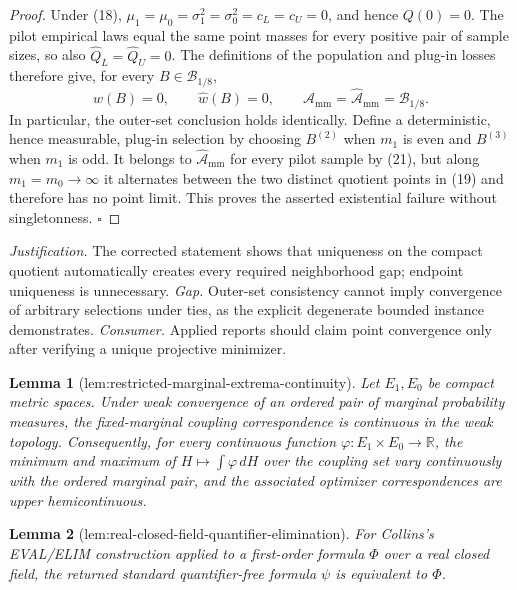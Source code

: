 \documentclass{article}
\newtheorem{lemma}{Lemma}
\begin{document}
\begin{proof}
Under (18), \(\mu_1=\mu_0=\sigma_1^2=\sigma_0^2=c_L=c_U=0\), and hence \(Q(0)=0\).  The pilot empirical laws equal the same point masses for every positive pair of sample sizes, so also \(\widehat Q_L=\widehat Q_U=0\).  The definitions of the population and plug-in losses therefore give, for every \(B\in\mathcal B_{1/8}\),
\[
w(B)=0,
\qquad
\widehat w(B)=0,
\qquad
\mathcal A_{\mathrm{mm}}
=\widehat{\mathcal A}_{\mathrm{mm}}
=\mathcal B_{1/8}.
\tag{21}
\]
In particular, the outer-set conclusion holds identically.  Define a deterministic, hence measurable, plug-in selection by choosing \(B^{(2)}\) when \(m_1\) is even and \(B^{(3)}\) when \(m_1\) is odd.  It belongs to \(\widehat{\mathcal A}_{\mathrm{mm}}\) for every pilot sample by (21), but along \(m_1=m_0\to\infty\) it alternates between the two distinct quotient points in (19) and therefore has no point limit.  This proves the asserted existential failure without singletonness. \(\square\)
\end{proof}
\par\smallskip\noindent \textit{Justification.} The corrected statement shows that uniqueness on the compact quotient automatically creates every required neighborhood gap; endpoint uniqueness is unnecessary. \textit{Gap.} Outer-set consistency cannot imply convergence of arbitrary selections under ties, as the explicit degenerate bounded instance demonstrates. \textit{Consumer.} Applied reports should claim point convergence only after verifying a unique projective minimizer.

\begin{lemma}[lem:restricted-marginal-extrema-continuity]\label{lem:restricted-marginal-extrema-continuity}
Let \(E_1,E_0\) be compact metric spaces.  Under weak convergence of an ordered pair of marginal probability measures, the fixed-marginal coupling correspondence is continuous in the weak topology.  Consequently, for every continuous function \(\varphi:E_1\times E_0\to\mathbb R\), the minimum and maximum of \(H\mapsto\int\varphi\,dH\) over the coupling set vary continuously with the ordered marginal pair, and the associated optimizer correspondences are upper hemicontinuous.
\end{lemma}

\begin{lemma}[lem:real-closed-field-quantifier-elimination]\label{lem:real-closed-field-quantifier-elimination}
For Collins's EVAL/ELIM construction applied to a first-order formula \(\Phi\) over a real closed field, the returned standard quantifier-free formula \(\psi\) is equivalent to \(\Phi\).
\end{lemma}
\end{document}
